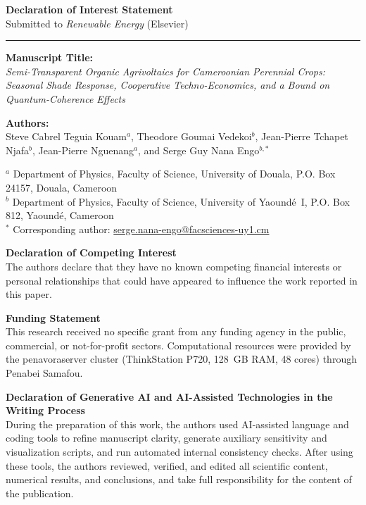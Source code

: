 \documentclass[11pt,a4paper]{article}
\begin{document}
\begin{center}
{\LARGE\bfseries Declaration of Interest Statement}\\[0.4em]
{\large Submitted to \textit{Renewable Energy} (Elsevier)}
\end{center}

\vspace{0.5em}
\noindent\rule{\textwidth}{0.6pt}

\vspace{0.6em}
\noindent
\textbf{Manuscript Title:}\\
\textit{Semi-Transparent Organic Agrivoltaics for Cameroonian Perennial Crops: Seasonal Shade Response, Cooperative Techno-Economics, and a Bound on Quantum-Coherence Effects}

\vspace{0.4em}
\noindent
\textbf{Authors:}\\
Steve Cabrel Teguia Kouam$^{a}$, Theodore Goumai Vedekoi$^{b}$, Jean-Pierre Tchapet Njafa$^{b}$, Jean-Pierre Nguenang$^{a}$, and Serge Guy Nana Engo$^{b,\ast}$

\vspace{0.2em}
\noindent
{\small
$^{a}$ Department of Physics, Faculty of Science, University of Douala, P.O. Box 24157, Douala, Cameroon\\
$^{b}$ Department of Physics, Faculty of Science, University of Yaound\'e~I, P.O. Box 812, Yaound\'e, Cameroon\\
$^\ast$ Corresponding author: \href{mailto:serge.nana-engo@facsciences-uy1.cm}{serge.nana-engo@facsciences-uy1.cm}
}

\vspace{0.8em}
\noindent
\textbf{Declaration of Competing Interest}\\
The authors declare that they have no known competing financial interests or personal relationships that could have appeared to influence the work reported in this paper.

\vspace{0.6em}
\noindent
\textbf{Funding Statement}\\
This research received no specific grant from any funding agency in the public, commercial, or not-for-profit sectors. Computational resources were provided by the penavoraserver cluster (ThinkStation P720, 128~GB RAM, 48 cores) through Penabei Samafou.

\vspace{0.6em}
\noindent
\textbf{Declaration of Generative AI and AI-Assisted Technologies in the Writing Process}\\
During the preparation of this work, the authors used AI-assisted language and coding tools to refine manuscript clarity, generate auxiliary sensitivity and visualization scripts, and run automated internal consistency checks. After using these tools, the authors reviewed, verified, and edited all scientific content, numerical results, and conclusions, and take full responsibility for the content of the publication.
\end{document}
